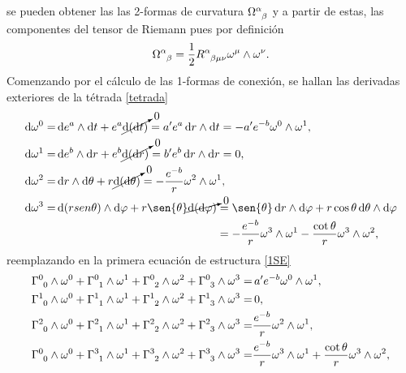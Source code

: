 se pueden obtener las las 2-formas de curvatura $\tensor{\Omega}{^\alpha_\beta}$ y a partir de estas, las componentes del tensor de Riemann pues por definición 
\begin{equation}
    \tensor{\Omega}{^\alpha_\beta}=\frac{1}{2}\tensor{R}{^\alpha_\beta_\mu_\nu}\omega^\mu \wedge \omega^\nu.
\end{equation}
Comenzando por el cálculo de las 1-formas de conexión, se hallan las derivadas exteriores de la tétrada \eqref{tetrada}
    \begin{align}
    \begin{split}
        \dd{\omega^0}=&\dd{e^a} \wedge \dd{t}+e^a\cancelto{0}{\dd{(\dd{t})}} = a^{\prime} e^a \dd{r}\wedge\dd{t} = -a^{\prime} e^{-b} \omega^0 \wedge \omega^1, \\
        \dd{\omega^1}=&\dd{e^b}\wedge\dd{r}+e^b\cancelto{0}{\dd{(\dd{r})}} = b^{\prime}e^b\dd{r}\wedge\dd{r}=0, \\
        \dd{\omega^2}=&\dd{r}\wedge\dd{\theta} + r\cancelto{0}{\dd{(\dd{\theta})}} = -\frac{e^{-b}}{r}\omega^2 \wedge\omega^1, \\
        \dd{\omega^3}=&\dd{(rsen\theta)}\wedge\dd{\varphi} + r\sen{\theta}\cancelto{0}{\dd{(\dd{\varphi})}} = \sen{\theta}\dd{r}\wedge\dd{\varphi} + r\cos{\theta}\dd{\theta}\wedge\dd{\varphi} \\
        & \phantom{{}\dd{(rsen\theta)}\wedge\dd{\varphi} + r\sen{\theta}\cancelto{0}{\dd{(\dd{\varphi})}}} = -\frac{e^{-b}}{r} \omega^3 \wedge \omega^1 - \frac{\cot{\theta}}{r} \omega^3 \wedge \omega^2,
    \end{split}
    \end{align}
reemplazando en la primera ecuación de estructura \eqref{1SE}
    \begin{align*}
        \tensor{\Gamma}{^0_0}\wedge\omega^0 + \tensor{\Gamma}{^0_1}\wedge\omega^1+\tensor{\Gamma}{^0_2}\wedge\omega^2+\tensor{\Gamma}{^0_3}\wedge\omega^3 =& \,a^{\prime} e^{-b} \omega^0 \wedge \omega^1,  \\
        \tensor{\Gamma}{^1_0}\wedge\omega^0 + \tensor{\Gamma}{^1_1}\wedge\omega^1+\tensor{\Gamma}{^1_2}\wedge\omega^2+\tensor{\Gamma}{^1_3}\wedge\omega^3 =&\, 0, \\
        \tensor{\Gamma}{^2_0}\wedge\omega^0 + \tensor{\Gamma}{^2_1}\wedge\omega^1+\tensor{\Gamma}{^2_2}\wedge\omega^2+\tensor{\Gamma}{^2_3}\wedge\omega^3 =& \frac{e^{-b}}{r}\omega^2 \wedge\omega^1, \\
        \tensor{\Gamma}{^0_0}\wedge\omega^0 + \tensor{\Gamma}{^3_1}\wedge\omega^1+\tensor{\Gamma}{^3_2}\wedge\omega^2+\tensor{\Gamma}{^3_3}\wedge\omega^3 =& \frac{e^{-b}}{r} \omega^3 \wedge \omega^1 + \frac{\cot{\theta}}{r} \omega^3 \wedge \omega^2,
    \end{align*}    
